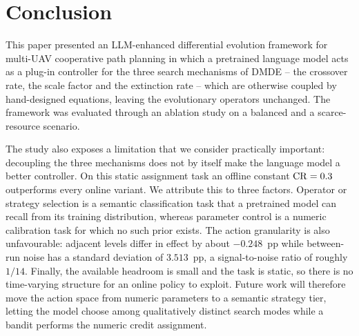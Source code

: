 
\section{Conclusion}
\label{sec:conclusion}

This paper presented an LLM-enhanced differential evolution framework for
multi-UAV cooperative path planning in which a pretrained language model acts as
a plug-in controller for the three search mechanisms of DMDE -- the crossover
rate, the scale factor and the extinction rate -- which are otherwise coupled by
hand-designed equations, leaving the evolutionary operators unchanged. The
framework was evaluated through an ablation study on a balanced and a
scarce-resource scenario.

The study also exposes a limitation that we consider practically important:
decoupling the three mechanisms does not by itself make the language model a
better controller. On this static assignment task an offline constant
$\mathrm{CR} = 0.3$ outperforms every online variant. We attribute this to three
factors. Operator or strategy selection is a semantic classification task that a
pretrained model can recall from its training distribution, whereas parameter
control is a numeric calibration task for which no such prior exists. The action
granularity is also unfavourable: adjacent \CR{} levels differ in effect by
about $-0.248$~pp while between-run noise has a standard deviation of
$3.513$~pp, a signal-to-noise ratio of roughly $1/14$. Finally, the available
headroom is small and the task is static, so there is no time-varying structure
for an online policy to exploit. Future work will therefore move the action
space from numeric parameters to a semantic strategy tier, letting the model
choose among qualitatively distinct search modes while a bandit performs the
numeric credit assignment. %
